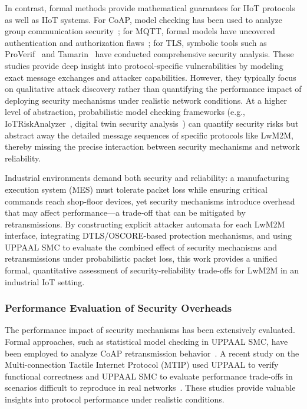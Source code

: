 \documentclass[a4paper,fleqn]{cas-sc}
\begin{document}
In contrast, formal methods provide mathematical guarantees for IIoT protocols as well as IIoT systems. For CoAP, model checking has been used to analyze group communication security~\cite{chen2021formalization}; for MQTT, formal models have uncovered authentication and authorization flaws~\cite{lin2025formal}; for TLS, symbolic tools such as ProVerif~\cite{Sardar2024} and Tamarin~\cite{cremers2017comprehensive} have conducted comprehensive security analysis. These studies provide deep insight into protocol‑specific vulnerabilities by modeling exact message exchanges and attacker capabilities. However, they typically focus on qualitative attack discovery rather than quantifying the performance impact of deploying security mechanisms under realistic network conditions. At a higher level of abstraction, probabilistic model checking frameworks (e.g., IoTRiskAnalyzer~\cite{mohsin2017iotriskanalyzer}, digital twin security analysis~\cite{shaikh2023security}) can quantify security risks but abstract away the detailed message sequences of specific protocols like LwM2M, thereby missing the precise interaction between security mechanisms and network reliability.

Industrial environments demand both security and reliability: a manufacturing execution system (MES) must tolerate packet loss while ensuring critical commands reach shop‑floor devices, yet security mechanisms introduce overhead that may affect performance—a trade‑off that can be mitigated by retransmissions. By constructing explicit attacker automata for each LwM2M interface, integrating DTLS/OSCORE-based protection mechanisms, and using UPPAAL SMC to evaluate the combined effect of security mechanisms and retransmissions under probabilistic packet loss, this work provides a unified formal, quantitative assessment of security‑reliability trade‑offs for LwM2M in an industrial IoT setting.

\subsubsection{Performance Evaluation of Security Overheads}
The performance impact of security mechanisms has been extensively evaluated. Formal approaches, such as statistical model checking in UPPAAL SMC, have been employed to analyze CoAP retransmission behavior~\cite{khelili2025toward}. A recent study on the Multi-connection Tactile Internet Protocol (MTIP) used UPPAAL to verify functional correctness and UPPAAL SMC to evaluate performance trade‑offs in scenarios difficult to reproduce in real networks~\cite{Rico2023}. These studies provide valuable insights into protocol performance under realistic conditions. 
\end{document}
